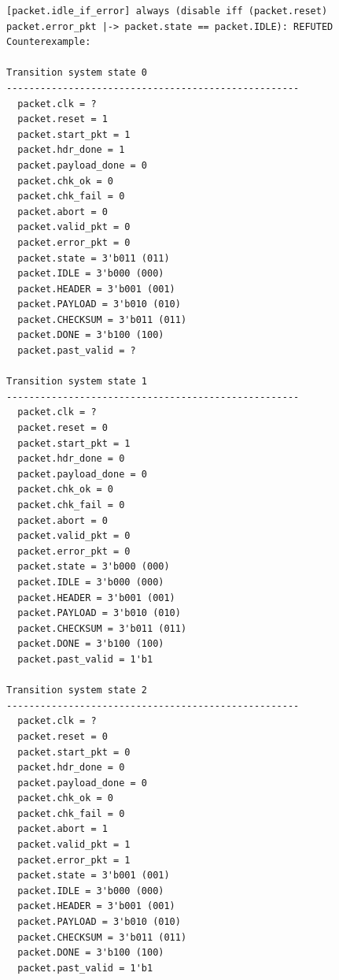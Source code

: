 \documentclass{article}
\begin{document}
\begin{lstlisting}
[packet.idle_if_error] always (disable iff (packet.reset) packet.error_pkt |-> packet.state == packet.IDLE): REFUTED
Counterexample:
 
Transition system state 0
----------------------------------------------------
  packet.clk = ?
  packet.reset = 1
  packet.start_pkt = 1
  packet.hdr_done = 1
  packet.payload_done = 0
  packet.chk_ok = 0
  packet.chk_fail = 0
  packet.abort = 0
  packet.valid_pkt = 0
  packet.error_pkt = 0
  packet.state = 3'b011 (011)
  packet.IDLE = 3'b000 (000)
  packet.HEADER = 3'b001 (001)
  packet.PAYLOAD = 3'b010 (010)
  packet.CHECKSUM = 3'b011 (011)
  packet.DONE = 3'b100 (100)
  packet.past_valid = ?
 
Transition system state 1
----------------------------------------------------
  packet.clk = ?
  packet.reset = 0
  packet.start_pkt = 1
  packet.hdr_done = 0
  packet.payload_done = 0
  packet.chk_ok = 0
  packet.chk_fail = 0
  packet.abort = 0
  packet.valid_pkt = 0
  packet.error_pkt = 0
  packet.state = 3'b000 (000)
  packet.IDLE = 3'b000 (000)
  packet.HEADER = 3'b001 (001)
  packet.PAYLOAD = 3'b010 (010)
  packet.CHECKSUM = 3'b011 (011)
  packet.DONE = 3'b100 (100)
  packet.past_valid = 1'b1
 
Transition system state 2
----------------------------------------------------
  packet.clk = ?
  packet.reset = 0
  packet.start_pkt = 0
  packet.hdr_done = 0
  packet.payload_done = 0
  packet.chk_ok = 0
  packet.chk_fail = 0
  packet.abort = 1
  packet.valid_pkt = 1
  packet.error_pkt = 1
  packet.state = 3'b001 (001)
  packet.IDLE = 3'b000 (000)
  packet.HEADER = 3'b001 (001)
  packet.PAYLOAD = 3'b010 (010)
  packet.CHECKSUM = 3'b011 (011)
  packet.DONE = 3'b100 (100)
  packet.past_valid = 1'b1
 

\end{lstlisting}
\end{document}
